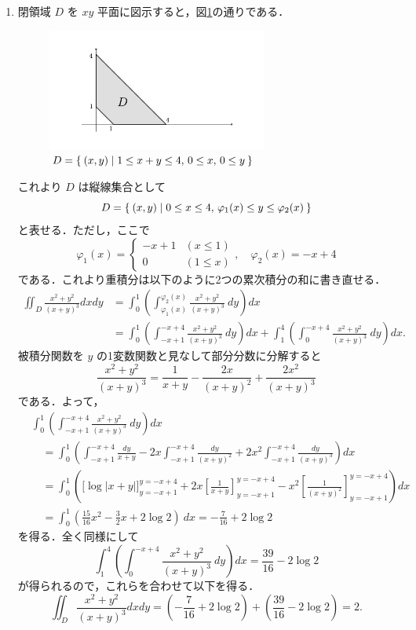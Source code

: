 \documentclass[11pt, uplatex, dvipdfmx]{jsarticle}
\begin{document}
\begin{enumerate}[(1)]
   \item 閉領域 $D$ を $xy$ 平面に図示すると，図\ref{fig:no14}の通りである．
     \begin{figure}[h]
       \centering
       \includegraphics[height=4cm]{./pictures/no14.pdf}
       \caption{ $D=\Set{ (x,y)  |  1 \leq x+y \leq 4, \, 0 \leq x, \, 0 \leq y }$ }\label{fig:no14}
     \end{figure}
     
     これより $D$ は縦線集合として
     \[
       D=\Set{ (x,y)  |  0 \leq x \leq 4, \, \varphi_1(x) \leq y \leq \varphi_2(x) }
     \]
     と表せる．ただし，ここで
     \[
       \varphi_1(x) = \left\{
         \begin{array}{cl}
           -x+1 & (x \leq 1)\\
           0 & (1 \leq x)
         \end{array}
       \right. , \quad \varphi_2(x) = -x+4
     \]
     である．これより重積分は以下のように2つの累次積分の和に書き直せる．
     \begin{align*}
       \iint_D \frac{x^2+y^2}{(x+y)^3} dx dy
       &= \int_{0}^{1} \left( \int_{\varphi_1(x)}^{\varphi_2(x)} \frac{x^2+y^2}{(x+y)^3} \ dy \right)dx\\
       &= \int_{0}^{1} \left( \int_{-x+1}^{-x+4} \frac{x^2+y^2}{(x+y)^3} \  dy \right)dx 
         + \int_{1}^{4} \left( \int_{0}^{-x+4} \frac{x^2+y^2}{(x+y)^3} \  dy \right) dx.
     \end{align*}
     被積分関数を $y$ の1変数関数と見なして部分分数に分解すると
     \[
       \frac{x^2+y^2}{(x+y)^3} = \frac{1}{x+y}-\frac{2x}{(x+y)^2} + \frac{2x^2}{(x+y)^3}
     \]
     である．よって，
     \begin{align*}
       & \int_{0}^{1} \left( \int_{-x+1}^{-x+4} \frac{x^2+y^2}{(x+y)^3} \ dy \right) dx\\
       & \quad = \int_{0}^{1} \left( \int_{-x+1}^{-x+4}\frac{dy}{x+y} -2x \int_{-x+1}^{-x+4} \frac{dy}{(x+y)^2}
         + 2x^2 \int_{-x+1}^{-x+4} \frac{dy}{(x+y)^3} \right) dx\\
       & \quad = \int_{0}^{1}\left(\Big[ \log |x+y| \Big]_{y=-x+1}^{y=-x+4}
         + 2x\left[\frac{1}{x+y}\right]_{y=-x+1}^{y=-x+4}
         -x^2 \left[ \frac{1}{(x+y)^2}\right]_{y=-x+1}^{y=-x+4} \right) dx\\
       & \quad = \int_{0}^{1} \left( \frac{15}{16}x^2-\frac{3}{2} x + 2\log 2 \right) \ dx=-\frac{7}{16}+2\log 2
     \end{align*}
     を得る．全く同様にして
     \[
       \int_{1}^{4}\left( \int_{0}^{-x+4} \frac{x^2+y^2}{(x+y)^3}\  dy \right) dx = \frac{39}{16}-2\log 2
     \]
     が得られるので，これらを合わせて以下を得る．
     \[
       \iint_{D} \frac{x^2+y^2}{(x+y)^3}dxdy = \left(-\frac{7}{16}+2\log 2\right)
       + \left(\frac{39}{16}-2\log2\right) = 2.
     \]
 


\end{enumerate}
\end{document}
